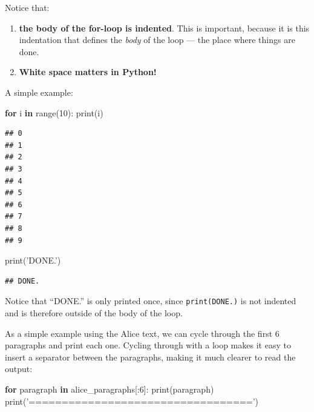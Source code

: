 \documentclass[]{book}
\newenvironment{Shaded}{\begin{snugshade}}{\end{snugshade}}
\newcommand{\BuiltInTok}[1]{#1}
\newcommand{\ControlFlowTok}[1]{\textcolor[rgb]{0.13,0.29,0.53}{\textbf{#1}}}
\newcommand{\DecValTok}[1]{\textcolor[rgb]{0.00,0.00,0.81}{#1}}
\newcommand{\KeywordTok}[1]{\textcolor[rgb]{0.13,0.29,0.53}{\textbf{#1}}}
\newcommand{\NormalTok}[1]{#1}
\newcommand{\StringTok}[1]{\textcolor[rgb]{0.31,0.60,0.02}{#1}}
\providecommand{\tightlist}{%
  \setlength{\itemsep}{0pt}\setlength{\parskip}{0pt}}
\begin{document}
Notice that:

\begin{enumerate}
\def\labelenumi{\arabic{enumi}.}
\tightlist
\item
  \textbf{the body of the for-loop is indented}. This is important, because it is this indentation that defines the \emph{body} of the loop --- the place where things are done.
\item
  \textbf{White space matters in Python!}
\end{enumerate}

A simple example:

\begin{Shaded}
\begin{Highlighting}[]
\ControlFlowTok{for}\NormalTok{ i }\KeywordTok{in} \BuiltInTok{range}\NormalTok{(}\DecValTok{10}\NormalTok{):}
    \BuiltInTok{print}\NormalTok{(i)}
\end{Highlighting}
\end{Shaded}

\begin{verbatim}
## 0
## 1
## 2
## 3
## 4
## 5
## 6
## 7
## 8
## 9
\end{verbatim}

\begin{Shaded}
\begin{Highlighting}[]
\BuiltInTok{print}\NormalTok{(}\StringTok{'DONE.'}\NormalTok{)}
\end{Highlighting}
\end{Shaded}

\begin{verbatim}
## DONE.
\end{verbatim}

Notice that ``DONE.'' is only printed once, since \texttt{print(\textquotesingle{}DONE.\textquotesingle{})} is not indented and is therefore outside of the body of the loop.

As a simple example using the Alice text, we can cycle through the first 6 paragraphs and print each one. Cycling through with a loop makes it easy to insert a separator between the paragraphs, making it much clearer to read the output:

\begin{Shaded}
\begin{Highlighting}[]
\ControlFlowTok{for}\NormalTok{ paragraph }\KeywordTok{in}\NormalTok{ alice_paragraphs[:}\DecValTok{6}\NormalTok{]:}
    \BuiltInTok{print}\NormalTok{(paragraph)}
    \BuiltInTok{print}\NormalTok{(}\StringTok{'=================================='}\NormalTok{)}
\end{Highlighting}
\end{Shaded}
\end{document}
